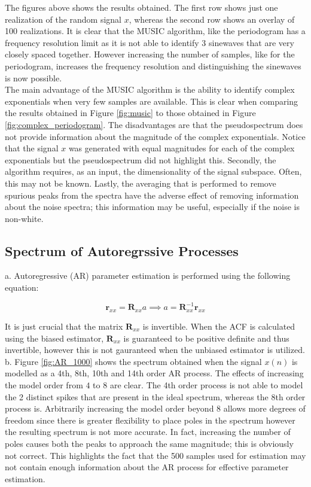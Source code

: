 \noindent{}The figures above shows the results obtained. The first row shows just one realization of the random signal $x$, whereas the second row shows an overlay of 100 realizations. It is clear that the MUSIC algorithm, like the periodogram has a frequency resolution limit as it is not able to identify 3 sinewaves that are very closely spaced together. However increasing the number of samples, like for the periodogram, increases the frequency resolution and distinguishing the sinewaves is now possible.\\

\noindent{}The main advantage of the MUSIC algorithm is the ability to identify complex exponentials when very few samples are available. This is clear when comparing the results obtained in Figure \ref{fig:music} to those obtained in Figure \ref{fig:complex_periodogram}. The disadvantages are that the pseudospectrum does not provide information about the magnitude of the complex exponentials. Notice that the signal $x$ was generated with equal magnitudes for each of the complex exponentials but the pseudospectrum did not highlight this. Secondly, the algorithm requires, as an input, the dimensionality of the signal subspace. Often, this may not be known. Lastly, the averaging that is performed to remove spurious peaks from the spectra have the adverse effect of removing information about the noise spectra; this information may be useful, especially if the noise is non-white.


\subsection{Spectrum of Autoregrssive Processes}

\noindent{}a. Autoregressive (AR) parameter estimation is performed using the following equation:

\begin{equation*}
\textbf{r}_{xx} = \textbf{R}_{xx}a \implies a = \textbf{R}_{xx}^{-1}\textbf{r}_{xx}
\end{equation*}

\noindent{}It is just crucial that the matrix $\textbf{R}_{xx}$ is invertible. When the ACF is calculated using the biased estimator, $\textbf{R}_{xx}$ is guaranteed to be positive definite and thus invertible, however this is not gauranteed when the unbiased estimator is utilized.\\

\noindent{}b. Figure \ref{fig:AR_1000} shows the spectrum obtained when the signal $x(n)$ is modelled as a 4th, 8th, 10th and 14th order AR process. The effects of increasing the model order from $4$ to $8$ are clear. The 4th order process is not able to model the 2 distinct spikes that are present in the ideal spectrum, whereas the 8th order process is. Arbitrarily increasing the model order beyond 8 allows more degrees of freedom since there is greater flexibility to place poles in the spectrum however the resulting spectrum is not more accurate. In fact, increasing the number of poles causes both the peaks to approach the same magnitude; this is obviously not correct. This highlights the fact that the 500 samples used for estimation may not contain enough information about the AR process for effective parameter estimation.

